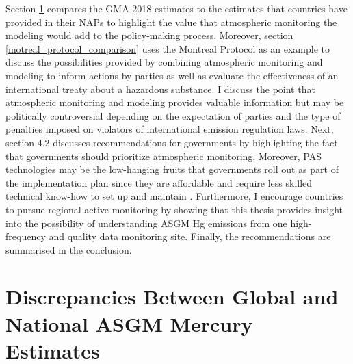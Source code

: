 \begin{flushleft}
Section \ref{nap_gma18_differences} compares the GMA 2018 estimates to the estimates that countries have provided in their NAPs to highlight the value that atmospheric monitoring the modeling would add to the policy-making process. Moreover, section \ref{motreal_protocol_comparison} uses the Montreal Protocol as an example to discuss the possibilities provided by combining atmospheric monitoring and modeling to inform actions by parties as well as evaluate the effectiveness of an international treaty about a hazardous substance. I discuss the point that atmospheric monitoring and modeling provides valuable information but may be politically controversial depending on the expectation of parties and the type of penalties imposed on violators of international emission regulation laws. Next, section 4.2 discusses recommendations for governments by highlighting the fact that governments should prioritize atmospheric monitoring. Moreover, PAS technologies may be the low-hanging fruits that governments roll out as part of the implementation plan since they are affordable and require less skilled technical know-how to set up and maintain \cite{quant_measuring_2021}. Furthermore, I encourage countries to pursue regional active monitoring  by showing that this thesis provides insight into the possibility of understanding ASGM Hg emissions from one high-frequency and quality data monitoring site. Finally, the recommendations are summarised in the conclusion. 
\end{flushleft}

\section{Discrepancies Between Global and National ASGM Mercury Estimates}\label{nap_gma18_differences}

